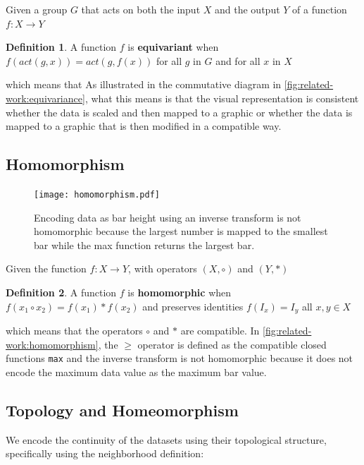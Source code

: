 \documentclass[review]{vgtc}
\theoremstyle{definition}
\newtheorem{definition}{Definition}[section]
\theoremstyle{remark}
\begin{document}
 Given a group $G$ that acts on both the input $X$ and the output $Y$ of a function $f: X \rightarrow Y$

\begin{definition}\label{def:equivariance}
 A function $f$ is \textbf{equivariant} when $f(act(g,x)) = act(g,f(x))$ for all $g$ in $G$ and for all $x$ in $X$ \cite{pittsNominalSetsNames2013}
\end{definition}
which means that
 As illustrated in the commutative diagram in \autoref{fig:related-work:equivariance}, what this means is that the visual representation is consistent whether the data is scaled and then mapped to a graphic or whether the data is mapped to a graphic that is then modified in a compatible way.

\subsection{Homomorphism}

\begin{figure}
  \texttt{[image: homomorphism.pdf]}
  \caption{Encoding data as bar height using an inverse transform is not homomorphic because the largest number is mapped to the smallest bar while the max function returns the largest bar.}
  \label{fig:related-work:homomorphism}
\end{figure}

Given the function $f: X \rightarrow Y$, with operators $(X, \circ)$ and $(Y, *)$

\begin{definition}\label{def:homomorphism}
  A function $f$ is \textbf{homomorphic} when $f(x_1 \circ x_2) = f(x_1) * f(x_2)$ and preserves identities $f(I_x) = I_y$ all $x, y \in X$ \cite{grimaldiDiscreteCombinatorialMathematics2006}
\end{definition}

which means that the operators $\circ$ and $*$ are compatible. In \autoref{fig:related-work:homomorphism}, the $\geq$ operator is defined as the compatible closed functions \texttt{max} and the inverse transform
is not homomorphic because it does not encode the maximum data value as the maximum bar value.

\subsection{Topology and Homeomorphism}

We encode the continuity of the datasets using their topological structure, specifically using the neighborhood definition:
\end{document}
